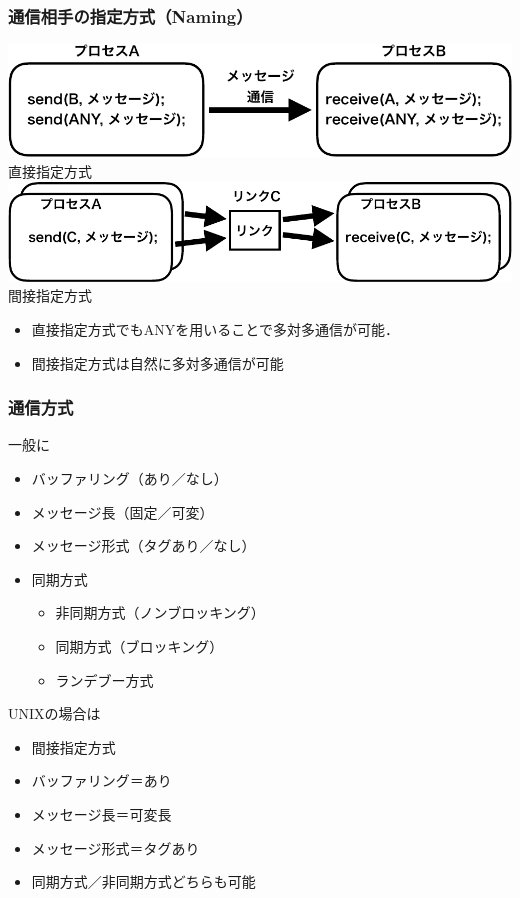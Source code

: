 \documentclass{beamer}                   %
\begin{document}
\begin{frame}
  \frametitle{通信相手の指定方式（Naming）}
  \begin{center}
    \includegraphics[scale=0.6]{Fig/ipcDirect-crop.pdf}\\
    直接指定方式
    \includegraphics[scale=0.6]{Fig/ipcIndirect-crop.pdf}\\
    間接指定方式
  \end{center}
  \begin{itemize}
  \item 直接指定方式でもANYを用いることで多対多通信が可能．
  \item 間接指定方式は自然に多対多通信が可能
  \end{itemize}
\end{frame}

\begin{frame}
  \frametitle{通信方式}
  一般に
  \begin{itemize}
  \item バッファリング（あり／なし）
  \item メッセージ長（固定／可変）
  \item メッセージ形式（タグあり／なし）
  \item 同期方式
    \begin{itemize}
    \item 非同期方式（ノンブロッキング）
    \item 同期方式（ブロッキング）
    \item ランデブー方式
    \end{itemize}
  \end{itemize}

  UNIXの場合は
  \begin{itemize}
  \item 間接指定方式
  \item バッファリング＝あり
  \item メッセージ長＝可変長
  \item メッセージ形式＝タグあり
  \item 同期方式／非同期方式どちらも可能
  \end{itemize}
\end{frame}
\end{document}
